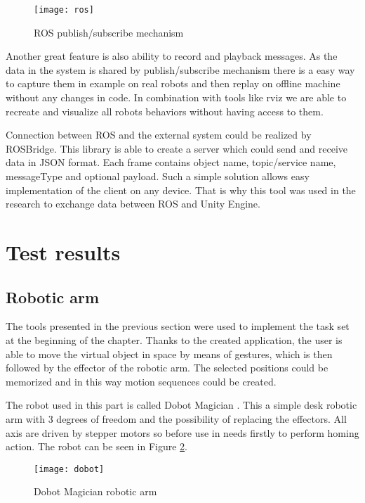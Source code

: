 \documentclass[printmode,en]{mgr}
\begin{document}
\begin{figure}[!ht]
  \centering
    \texttt{[image: ros]}
  \caption{ROS publish/subscribe mechanism}
  \label{fig:ros}
\end{figure}

Another great feature is also ability to record and playback messages. As the data in the system is shared by publish/subscribe mechanism there is a easy way to capture them in example on real robots and then replay on offline machine without any changes in code. In combination with tools like rviz we are able to recreate and visualize all robots behaviors without having access to them.

Connection between ROS and the external system could be realized by ROSBridge. This library is able to create a server which could send and receive data in JSON format. Each frame contains object name, topic/service name, messageType and optional payload. Such a simple solution allows easy implementation of the client on any device. That is why this tool was used in the research to exchange data between ROS and Unity Engine.

\section{Test results}

\subsection{Robotic arm}
The tools presented in the previous section were used to implement the task set at the beginning of the chapter. Thanks to the created application, the user is able to move the virtual object in space by means of gestures, which is then followed by the effector of the robotic arm. The selected positions could be memorized and in this way motion sequences could be created.

The robot used in this part is called Dobot Magician \cite{dobot}. This a simple desk robotic arm with 3 degrees of freedom and the possibility of replacing the effectors. All axis are driven by stepper motors so before use in needs firstly to perform homing action. The robot can be seen in Figure \ref{fig:dobot}.

\begin{figure}[!ht]
  \centering
    \texttt{[image: dobot]}
  \caption{Dobot Magician robotic arm \cite{dobot}}
  \label{fig:dobot}
\end{figure}
\end{document}
